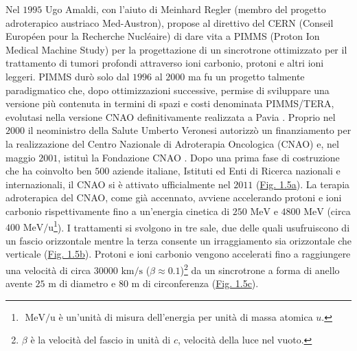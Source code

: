 \documentclass[12pt,a4paper,twoside]{report}
\begin{document}
	Nel $1995$ Ugo Amaldi, con l'aiuto di Meinhard Regler (membro del progetto adroterapico austriaco Med-Austron), propose al direttivo del CERN (Conseil Européen pour la Recherche Nucléaire) di dare vita a PIMMS (Proton Ion Medical Machine Study) per la progettazione di un sincrotrone ottimizzato per il trattamento di tumori profondi attraverso ioni carbonio, protoni e altri ioni leggeri. PIMMS durò solo dal $1996$ al $2000$ ma fu un progetto talmente paradigmatico che, dopo ottimizzazioni successive, permise di sviluppare una versione più contenuta in termini di spazi e costi denominata PIMMS/TERA, evolutasi nella versione CNAO definitivamente realizzata a Pavia \cite{cnao2}. Proprio nel $2000$ il neoministro della Salute Umberto Veronesi autorizzò un finanziamento per la realizzazione del Centro Nazionale di Adroterapia Oncologica (CNAO) e, nel maggio $2001$, istituì la Fondazione CNAO \cite{veronesi}. Dopo una prima fase di costruzione che ha coinvolto ben $500$ aziende italiane, Istituti ed Enti di Ricerca nazionali e internazionali, il CNAO si è attivato ufficialmente nel $2011$ (\hyperref[fig:edificio_cnao]{Fig. 1.5a}). La terapia adroterapica del CNAO, come già accennato, avviene accelerando protoni e ioni carbonio rispettivamente fino a un'energia cinetica di $250 \mbox{ MeV}$ e $4800\mbox{ MeV}$ (circa $400\mbox{ MeV/u}$\footnote{$\mbox{ MeV/u}$ è un'unità di misura dell'energia per unità di massa atomica $u$.}). I trattamenti si svolgono in tre sale, due delle quali usufruiscono di un fascio orizzontale mentre la terza consente un irraggiamento sia orizzontale che verticale (\hyperref[fig:sala_cnao]{Fig. 1.5b}). Protoni e ioni carbonio vengono accelerati fino a raggiungere una velocità di circa \num{30000}$\mbox{ km/s}$ ($\beta\approx0.1$)\footnote{$\beta$ è la velocità del fascio in unità di $c$, velocità della luce nel vuoto.} da un sincrotrone a forma di anello avente $25\mbox{ m}$ di diametro e $80\mbox{ m}$ di circonferenza (\hyperref[fig:sincrotrone_cnao]{Fig. 1.5c}).
\end{document}

